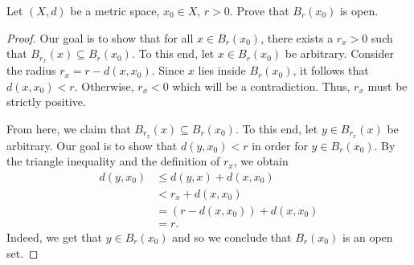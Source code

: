 \documentclass[a4paper]{article}
\begin{document}
\begin{problem}
    Let \( (X,d) \) be a metric space, \( {x}_{0} \in X  \), \( r > 0  \). Prove that \( {B}_{r}({x}_{0}) \) is open.
\end{problem}
\begin{proof}
Our goal is to show that for all \( x \in {B}_{r}({x}_{0}) \), there exists a \( {r}_{x} > 0  \) such that \( {B}_{{r}_{x}}(x) \subseteq {B}_{r}({x}_{0}) \). To this end, let \( x \in {B}_{r}({x}_{0})  \) be arbitrary. Consider the radius \( {r}_{x} = r - d(x, {x}_{0}) \). Since \( x  \) lies inside \( {B}_{r}({x}_{0}) \), it follows that \( d(x,{x}_{0}) < r  \). Otherwise, \( {r}_{x} < 0  \) which will be a contradiction. Thus, \( {r}_{x}  \) must be strictly positive. 

From here, we claim that \( {B}_{{r}_{x}}(x) \subseteq {B}_{r}({x}_{0}) \). To this end, let \( y \in {B}_{{r}_{x}}(x) \)  be arbitrary. Our goal is to show that \( d(y,{x}_{0}) < r  \) in order for \( y \in  {B}_{r}({x}_{0}) \). By the triangle inequality and the definition of \( {r}_{x} \), we obtain
\begin{align*}
    d(y,{x}_{0}) &\leq d(y,x) + d(x,{x}_{0}) \\
                 &<  {r}_{x} + d(x,{x}_{0}) \\
                 &= (r - d(x, {x}_{0})) + d(x,{x}_{0}) \\
                 &= r.
\end{align*}
Indeed, we get that \( y \in {B}_{r}({x}_{0}) \) and so we conclude that \( {B}_{r}({x}_{0}) \) is an open set.
\end{proof}
\end{document}
